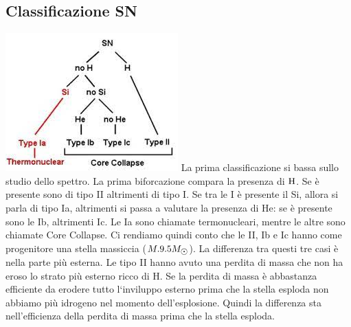 \subsection*{Classificazione SN}
\includegraphics{images/snclass.jpg}
La prima classificazione si bassa sullo studio dello spettro. La prima biforcazione compara la  presenza di $\ce{H}$. Se è presente sono di tipo II altrimenti di tipo I. Se tra le I è presente il Si, allora si parla di tipo Ia, altrimenti si passa a valutare la presenza di He: se è presente sono le Ib, altrimenti Ic. Le Ia sono chiamate termonucleari, mentre le altre sono chiamate Core Collapse. Ci rendiamo quindi conto che le II, Ib e Ic hanno come progenitore una stella massiccia ($M.9.5\sunmass$). La differenza tra questi tre casi è nella parte più esterna. Le tipo II hanno avuto una perdita di massa che non ha eroso lo strato più esterno ricco di H. Se la perdita di massa è abbastanza efficiente da erodere tutto l`inviluppo esterno prima che la stella esploda non abbiamo più idrogeno nel momento dell'esplosione. Quindi la differenza sta nell'efficienza della perdita di massa prima che la stella esploda.
